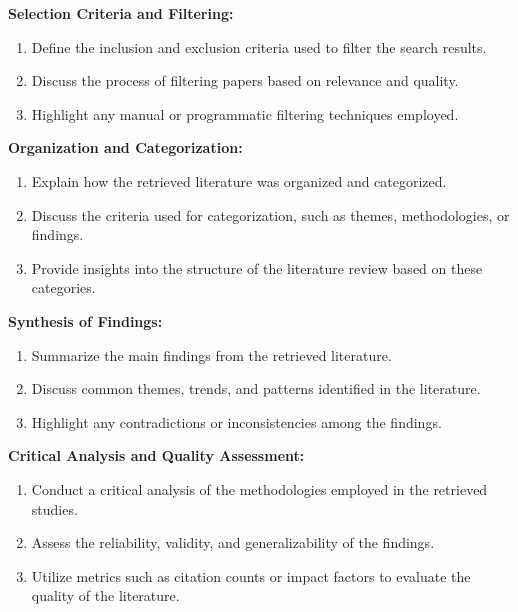 \documentclass[
  letterpaper,
  DIV=11,
  numbers=noendperiod]{scrreprt}
\providecommand{\tightlist}{%
  \setlength{\itemsep}{0pt}\setlength{\parskip}{0pt}}\usepackage{longtable,booktabs,array}
\begin{document}
\textbf{Selection Criteria and Filtering:}

\begin{enumerate}
\def\labelenumi{\arabic{enumi}.}
\tightlist
\item
  Define the inclusion and exclusion criteria used to filter the search
  results.
\item
  Discuss the process of filtering papers based on relevance and
  quality.
\item
  Highlight any manual or programmatic filtering techniques employed.
\end{enumerate}

\textbf{Organization and Categorization:}

\begin{enumerate}
\def\labelenumi{\arabic{enumi}.}
\tightlist
\item
  Explain how the retrieved literature was organized and categorized.
\item
  Discuss the criteria used for categorization, such as themes,
  methodologies, or findings.
\item
  Provide insights into the structure of the literature review based on
  these categories.
\end{enumerate}

\textbf{Synthesis of Findings:}

\begin{enumerate}
\def\labelenumi{\arabic{enumi}.}
\tightlist
\item
  Summarize the main findings from the retrieved literature.
\item
  Discuss common themes, trends, and patterns identified in the
  literature.
\item
  Highlight any contradictions or inconsistencies among the findings.
\end{enumerate}

\textbf{Critical Analysis and Quality Assessment:}

\begin{enumerate}
\def\labelenumi{\arabic{enumi}.}
\tightlist
\item
  Conduct a critical analysis of the methodologies employed in the
  retrieved studies.
\item
  Assess the reliability, validity, and generalizability of the
  findings.
\item
  Utilize metrics such as citation counts or impact factors to evaluate
  the quality of the literature.
\end{enumerate}
\end{document}
